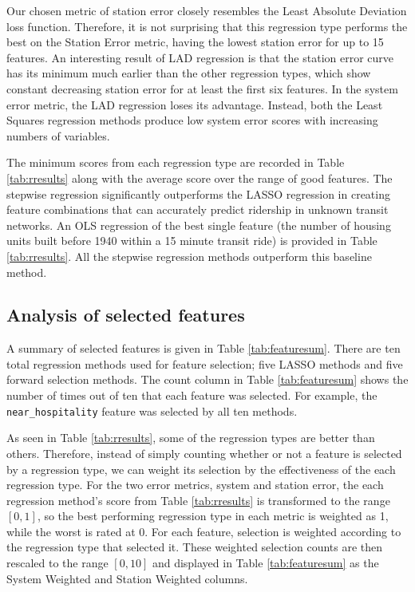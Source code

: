 \documentclass[11pt]{article}
\begin{document}
Our chosen metric of station error closely resembles the Least Absolute Deviation loss function. Therefore, it is not surprising that this regression type performs the best on the Station Error metric, having the lowest station error for up to 15 features. An interesting result of LAD regression is that the station error curve has its minimum much earlier than the other regression types, which show constant decreasing station error for at least the first six features. In the system error metric, the LAD regression loses its advantage. Instead, both the Least Squares regression methods produce low system error scores with increasing numbers of variables. 

The minimum scores from each regression type are recorded in Table \ref{tab:rresults} along with the average score over the range of good features. The stepwise regression significantly outperforms the LASSO regression in creating feature combinations that can accurately predict ridership in unknown transit networks. An OLS regression of the best single feature (the number of housing units built before 1940 within a 15 minute transit ride) is provided in Table \ref{tab:rresults}. All the stepwise regression methods outperform this baseline method. 

\subsection{Analysis of selected features}

A summary of selected features is given in Table \ref{tab:featuresum}. There are ten total regression methods used for feature selection; five LASSO methods and five forward selection methods. The count column in Table \ref{tab:featuresum} shows the number of times out of ten that each feature was selected. For example, the \texttt{near\_hospitality} feature was selected by all ten methods.

As seen in Table \ref{tab:rresults}, some of the regression types are better than others. Therefore, instead of simply counting whether or not a feature is selected by a regression type, we can weight its selection by the effectiveness of the each regression type. For the two error metrics, system and station error, the each regression method's score from Table \ref{tab:rresults} is transformed to the range $[0, 1]$, so the best performing regression type in each metric is weighted as 1, while the worst is rated at 0. For each feature, selection is weighted according to the regression type that selected it. These weighted selection counts are then rescaled to the range $[0, 10]$ and displayed in Table \ref{tab:featuresum} as the System Weighted and Station Weighted columns.
\end{document}
